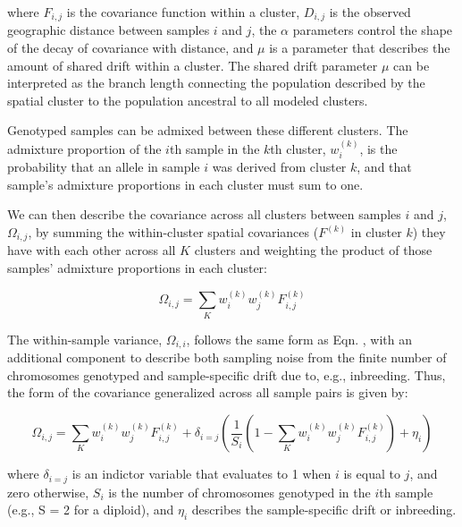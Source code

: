\documentclass[12pt]{article}
\begin{document}
where $F_{i,j}$ is the covariance function within a cluster,
$D_{i,j}$ is the observed geographic distance between samples $i$ and $j$,
the $\alpha$ parameters control the shape of the decay of covariance with distance,
and $\mu$ is a parameter that describes the amount of shared drift within a cluster.
The shared drift parameter $\mu$ can be interpreted as the branch length connecting 
the population described by the spatial cluster to the population ancestral to all modeled clusters.

Genotyped samples can be admixed between these different clusters. 
The admixture proportion of the $i$th sample in the $k$th cluster, $w^{(k)}_i$,
is the probability that an allele in sample $i$ was derived from cluster $k$, 
and that sample's admixture proportions in each cluster must sum to one.

We can then describe the covariance across all clusters between samples $i$ and $j$, $\Omega_{i,j}$,
by summing the within-cluster spatial covariances ($F^{(k)}$ in cluster $k$) they have with each other across all $K$ clusters
and weighting the product of those samples' admixture proportions in each cluster:

\begin{equation}
\Omega_{i,j} = \sum\limits_K w^{(k)}_i w^{(k)}_j F^{(k)}_{i,j}
\label{cross_cluster_covariance}
\end{equation}

The within-sample variance, $\Omega_{i,i}$, follows the same form as Eqn. ,
with an additional component to describe both sampling noise from the finite number of chromosomes genotyped 
and sample-specific drift due to, e.g., inbreeding.  
Thus, the form of the covariance generalized across all sample pairs is given by:

\begin{equation}
\Omega_{i,j} = \sum\limits_K w^{(k)}_i w^{(k)}_j F^{(k)}_{i,j} + 
\delta_{i=j} \left(	 \frac{1}{S_i}\left(1 - \sum\limits_K w^{(k)}_i w^{(k)}_j F^{(k)}_{i,j} \right) + \eta_i 	\right)
\label{cross_cluster_vcv}
\end{equation}

where $\delta_{i=j}$ is an indictor variable that evaluates to 1 when $i$ is equal to $j$, and zero otherwise,
$S_i$ is the number of chromosomes genotyped in the $i$th sample (e.g., S = 2 for a diploid), 
and $\eta_i$ describes the sample-specific drift or inbreeding.
\end{document}

